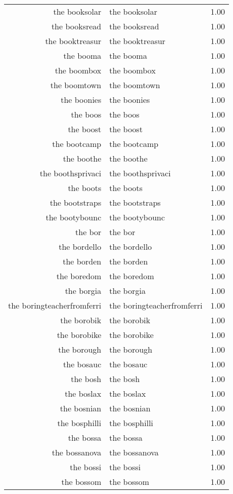 \begin{table}[ht]
\begin{tabular}{rlr}
  the booksolar & the booksolar & 1.00 \\ 
  the booksread & the booksread & 1.00 \\ 
  the booktreasur & the booktreasur & 1.00 \\ 
  the booma & the booma & 1.00 \\ 
  the boombox & the boombox & 1.00 \\ 
  the boomtown & the boomtown & 1.00 \\ 
  the boonies & the boonies & 1.00 \\ 
  the boos & the boos & 1.00 \\ 
  the boost & the boost & 1.00 \\ 
  the bootcamp & the bootcamp & 1.00 \\ 
  the boothe & the boothe & 1.00 \\ 
  the boothsprivaci & the boothsprivaci & 1.00 \\ 
  the boots & the boots & 1.00 \\ 
  the bootstraps & the bootstraps & 1.00 \\ 
  the bootybounc & the bootybounc & 1.00 \\ 
  the bor & the bor & 1.00 \\ 
  the bordello & the bordello & 1.00 \\ 
  the borden & the borden & 1.00 \\ 
  the boredom & the boredom & 1.00 \\ 
  the borgia & the borgia & 1.00 \\ 
  the boringteacherfromferri & the boringteacherfromferri & 1.00 \\ 
  the borobik & the borobik & 1.00 \\ 
  the borobike & the borobike & 1.00 \\ 
  the borough & the borough & 1.00 \\ 
  the bosauc & the bosauc & 1.00 \\ 
  the bosh & the bosh & 1.00 \\ 
  the boslax & the boslax & 1.00 \\ 
  the bosnian & the bosnian & 1.00 \\ 
  the bosphilli & the bosphilli & 1.00 \\ 
  the bossa & the bossa & 1.00 \\ 
  the bossanova & the bossanova & 1.00 \\ 
  the bossi & the bossi & 1.00 \\ 
  the bossom & the bossom & 1.00 \\ 

\end{tabular}
\end{table}
